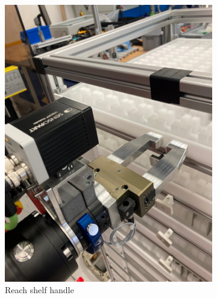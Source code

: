 \begin{figure}[h]
    \centering
    \begin{subfigure}[b]{0.32\textwidth}
        \centering
        \includegraphics[width=\textwidth]{figures/shelf-control/reach-handle.jpeg}
        \caption{Reach shelf handle}
        \label{subfig:reach-handle}
    \end{subfigure}\hspace{0.1cm}
    \begin{subfigure}[b]{0.32\textwidth}
        \centering

\end{subfigure}
\end{figure}
